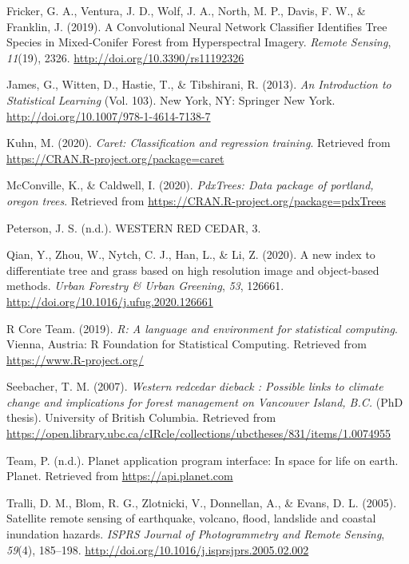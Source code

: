 \documentclass[12pt,twoside]{reedthesis}
\begin{document}
\leavevmode\hypertarget{ref-fricker_convolutional_2019}{}%
Fricker, G. A., Ventura, J. D., Wolf, J. A., North, M. P., Davis, F. W., \& Franklin, J. (2019). A Convolutional Neural Network Classifier Identifies Tree Species in Mixed-Conifer Forest from Hyperspectral Imagery. \emph{Remote Sensing}, \emph{11}(19), 2326. \url{http://doi.org/10.3390/rs11192326}

\leavevmode\hypertarget{ref-james_introduction_2013}{}%
James, G., Witten, D., Hastie, T., \& Tibshirani, R. (2013). \emph{An Introduction to Statistical Learning} (Vol. 103). New York, NY: Springer New York. \url{http://doi.org/10.1007/978-1-4614-7138-7}

\leavevmode\hypertarget{ref-caret}{}%
Kuhn, M. (2020). \emph{Caret: Classification and regression training}. Retrieved from \url{https://CRAN.R-project.org/package=caret}

\leavevmode\hypertarget{ref-pdxtrees}{}%
McConville, K., \& Caldwell, I. (2020). \emph{PdxTrees: Data package of portland, oregon trees}. Retrieved from \url{https://CRAN.R-project.org/package=pdxTrees}

\leavevmode\hypertarget{ref-peterson_western_nodate}{}%
Peterson, J. S. (n.d.). WESTERN RED CEDAR, 3.

\leavevmode\hypertarget{ref-qian_new_2020}{}%
Qian, Y., Zhou, W., Nytch, C. J., Han, L., \& Li, Z. (2020). A new index to differentiate tree and grass based on high resolution image and object-based methods. \emph{Urban Forestry \& Urban Greening}, \emph{53}, 126661. \url{http://doi.org/10.1016/j.ufug.2020.126661}

\leavevmode\hypertarget{ref-rstudio}{}%
R Core Team. (2019). \emph{R: A language and environment for statistical computing}. Vienna, Austria: R Foundation for Statistical Computing. Retrieved from \url{https://www.R-project.org/}

\leavevmode\hypertarget{ref-seebacher_western_2007}{}%
Seebacher, T. M. (2007). \emph{Western redcedar dieback : Possible links to climate change and implications for forest management on Vancouver Island, B.C.} (PhD thesis). University of British Columbia. Retrieved from \url{https://open.library.ubc.ca/cIRcle/collections/ubctheses/831/items/1.0074955}

\leavevmode\hypertarget{ref-planet}{}%
Team, P. (n.d.). Planet application program interface: In space for life on earth. Planet. Retrieved from \url{https://api.planet.com}

\leavevmode\hypertarget{ref-tralli_satellite_2005}{}%
Tralli, D. M., Blom, R. G., Zlotnicki, V., Donnellan, A., \& Evans, D. L. (2005). Satellite remote sensing of earthquake, volcano, flood, landslide and coastal inundation hazards. \emph{ISPRS Journal of Photogrammetry and Remote Sensing}, \emph{59}(4), 185--198. \url{http://doi.org/10.1016/j.isprsjprs.2005.02.002}
\end{document}
